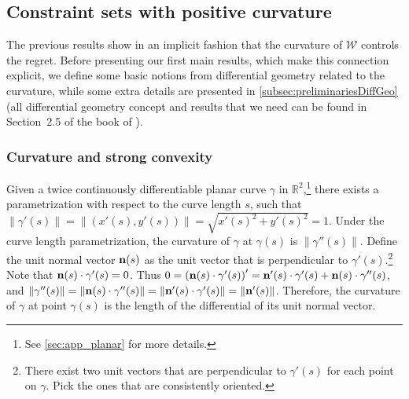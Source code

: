 \documentclass[english]{article}
\newcommand{\cW}{\mathcal{W}}
\newcommand{\real}{\mathbb{R}}
\begin{document}
\subsection{Constraint sets with positive curvature}
\label{subsec:positiveCurvature}
The previous results show in an implicit fashion that the curvature of $\cW$ controls the regret. Before presenting our first main results, which make this connection explicit, we define some basic notions from differential geometry related to the curvature, while some extra details are presented in \cref{subsec:preliminariesDiffGeo} (all differential geometry concept and results that we need can be found in Section~2.5 of the book of \citealp{Sch14:ConvexBodies}).

\subsubsection{Curvature and strong convexity}
\label{sec:curvature_intro}
Given a twice continuously differentiable planar curve $\gamma$ in $\real^2$,\footnote{See \cref{sec:app_planar} for more details.} there exists a parametrization with respect to the curve length $s$, such that $\|\gamma'(s)\| = \|\left(x'(s), y'(s)\right)\| = \sqrt{x'(s)^2 + y'(s)^2}=1$. Under the curve length parametrization, the curvature of $\gamma$ at $\gamma(s)$ is $\|\gamma''(s)\|$.
Define the unit normal vector ${\bf n}(s)$ as the unit vector that is perpendicular to $\gamma'(s)$.\footnote{There exist two unit vectors that are perpendicular to $\gamma'(s)$ for each point on $\gamma$. Pick the ones that are consistently oriented.}
Note that ${\bf n}(s)\cdot \gamma'(s) = 0$. Thus $0=\left({\bf n}(s)\cdot \gamma'(s)\right)' = {\bf n}'(s)\cdot\gamma'(s) + {\bf n}(s)\cdot \gamma''(s)$, and $\|\gamma''(s)\| = \|{\bf n}(s)\cdot \gamma''(s)\| = \|{\bf n}'(s)\cdot\gamma'(s)\| = \|{\bf n}'(s)\|$. Therefore, the curvature of $\gamma$ at point $\gamma(s)$ is the length of the differential of its unit normal vector.
 
\end{document}
